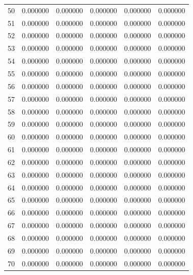 \begin{tabular}{lrrrrr}
50 & 0.000000 & 0.000000 & 0.000000 & 0.000000 & 0.000000 \\
51 & 0.000000 & 0.000000 & 0.000000 & 0.000000 & 0.000000 \\
52 & 0.000000 & 0.000000 & 0.000000 & 0.000000 & 0.000000 \\
53 & 0.000000 & 0.000000 & 0.000000 & 0.000000 & 0.000000 \\
54 & 0.000000 & 0.000000 & 0.000000 & 0.000000 & 0.000000 \\
55 & 0.000000 & 0.000000 & 0.000000 & 0.000000 & 0.000000 \\
56 & 0.000000 & 0.000000 & 0.000000 & 0.000000 & 0.000000 \\
57 & 0.000000 & 0.000000 & 0.000000 & 0.000000 & 0.000000 \\
58 & 0.000000 & 0.000000 & 0.000000 & 0.000000 & 0.000000 \\
59 & 0.000000 & 0.000000 & 0.000000 & 0.000000 & 0.000000 \\
60 & 0.000000 & 0.000000 & 0.000000 & 0.000000 & 0.000000 \\
61 & 0.000000 & 0.000000 & 0.000000 & 0.000000 & 0.000000 \\
62 & 0.000000 & 0.000000 & 0.000000 & 0.000000 & 0.000000 \\
63 & 0.000000 & 0.000000 & 0.000000 & 0.000000 & 0.000000 \\
64 & 0.000000 & 0.000000 & 0.000000 & 0.000000 & 0.000000 \\
65 & 0.000000 & 0.000000 & 0.000000 & 0.000000 & 0.000000 \\
66 & 0.000000 & 0.000000 & 0.000000 & 0.000000 & 0.000000 \\
67 & 0.000000 & 0.000000 & 0.000000 & 0.000000 & 0.000000 \\
68 & 0.000000 & 0.000000 & 0.000000 & 0.000000 & 0.000000 \\
69 & 0.000000 & 0.000000 & 0.000000 & 0.000000 & 0.000000 \\
70 & 0.000000 & 0.000000 & 0.000000 & 0.000000 & 0.000000 \\
\bottomrule
\end{tabular}
